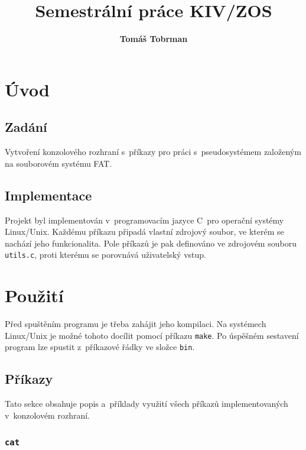 \documentclass[12pt]{article}
\author{\textbf{Tomáš Tobrman}}
\title{Semestrální práce \textbf{KIV/ZOS}}
\date{}
\begin{document}
\begin{titlingpage}
\maketitle
\thispagestyle{empty}
\end{titlingpage}
\newpage

\tableofcontents
\thispagestyle{empty}
\newpage

\setcounter{page}{1}

\section{Úvod}

\subsection{Zadání}

Vytvoření konzolového rozhraní s~příkazy pro práci s~pseudosystémem založeným na souborovém systému FAT.

\subsection{Implementace}

Projekt byl implementován v~programovacím jazyce C~pro operační systémy Linux/Unix.
Každému příkazu připadá vlastní zdrojový soubor, ve kterém se nachází jeho funkcionalita.
Pole příkazů je pak definováno ve zdrojovém souboru \texttt{utils.c}, proti kterému se porovnává uživatelský vstup.

\section{Použití}\label{sec:usage}

Před spuštěním programu je třeba zahájit jeho kompilaci.
Na systémech Linux/Unix je možné tohoto docílit pomocí příkazu \texttt{make}.
Po úspěšném sestavení program lze spustit z~příkazové řádky ve složce \texttt{bin}.

\subsection{Příkazy}\label{sec:commands}

Tato sekce obsahuje popis a~příklady využití všech příkazů implementovaných v~konzolovém rozhraní.

\subsubsection{\texttt{cat}}\label{sec:cat}
\end{document}
